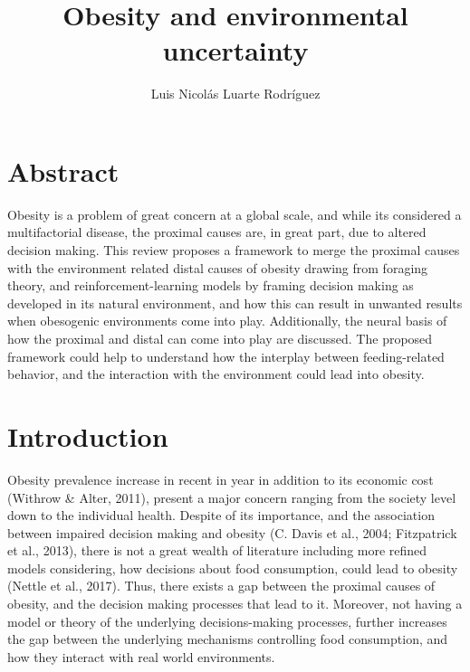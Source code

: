 \documentclass[
]{/home/nicoluarte/Downloads/templates/PNAS-template-main.tex}
\title{Obesity and environmental uncertainty}
\author{Luis Nicolás Luarte Rodríguez}
\date{}
\begin{document}
\maketitle

\hypertarget{abstract}{%
\section{Abstract}\label{abstract}}

Obesity is a problem of great concern at a global scale, and while its
considered a multifactorial disease, the proximal causes are, in great
part, due to altered decision making. This review proposes a framework
to merge the proximal causes with the environment related distal causes
of obesity drawing from foraging theory, and reinforcement-learning
models by framing decision making as developed in its natural
environment, and how this can result in unwanted results when obesogenic
environments come into play. Additionally, the neural basis of how the
proximal and distal can come into play are discussed. The proposed
framework could help to understand how the interplay between
feeding-related behavior, and the interaction with the environment could
lead into obesity.

\hypertarget{introduction}{%
\section{Introduction}\label{introduction}}

Obesity prevalence increase in recent in year in addition to its
economic cost (Withrow \& Alter, 2011), present a major concern ranging
from the society level down to the individual health. Despite of its
importance, and the association between impaired decision making and
obesity (C. Davis et al., 2004; Fitzpatrick et al., 2013), there is not
a great wealth of literature including more refined models considering,
how decisions about food consumption, could lead to obesity (Nettle et
al., 2017). Thus, there exists a gap between the proximal causes of
obesity, and the decision making processes that lead to it. Moreover,
not having a model or theory of the underlying decisions-making
processes, further increases the gap between the underlying mechanisms
controlling food consumption, and how they interact with real world
environments.
\end{document}
